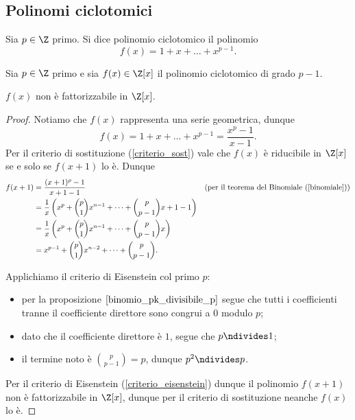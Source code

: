 \subsection{Polinomi ciclotomici}

\begin{definition}
    Sia $p \in \Z$ primo. Si dice polinomio ciclotomico il polinomio \[
        f(x) = 1 + x + \dots + x^{p-1}.    
    \]
\end{definition}

\begin{proposition}
    Sia $p \in \Z$ primo e sia $f(x) \in \Z[x]$ il polinomio ciclotomico di grado $p-1$. 

    $f(x)$ non è fattorizzabile in $\Z[x]$.
\end{proposition}
\begin{proof}
    Notiamo che $f(x)$ rappresenta una serie geometrica, dunque \[
        f(x) = 1 + x + \dots + x^{p-1} = \frac{x^p - 1}{x - 1}.    
    \] Per il criterio di sostituzione (\ref{criterio_sost}) vale che $f(x)$ è riducibile in $\Z[x]$ se e solo se $f(x+1)$ lo è. Dunque
    \begin{align*}
        f(x+1) &= \frac{(x+1)^p - 1}{x+1-1} &&\text{(per il teorema del Binomiale (\ref{binomiale}))}\\
        &= \frac1x \left( x^p + \binom{p}{1}x^{n-1} + \dots + \binom{p}{p-1}x + 1 - 1 \right)\\
        &= \frac1x \left( x^p + \binom{p}{1}x^{n-1} + \dots + \binom{p}{p-1}x \right)\\
        &= x^{p-1} + \binom{p}{1}x^{n-2} + \dots + \binom{p}{p-1}.
    \end{align*}

    Applichiamo il criterio di Eisenstein col primo $p$:
    \begin{itemize}
        \item per la proposizione $\ref{binomio_pk_divisibile_p}$ segue che tutti i coefficienti tranne il coefficiente direttore sono congrui a $0$ modulo $p$;
        \item dato che il coefficiente direttore è $1$, segue che $p \ndivides 1$;
        \item il termine noto è $\binom{p}{p-1} = p$, dunque $p^2 \ndivides p$.
    \end{itemize}
    Per il criterio di Eisenstein (\ref{criterio_eisenstein}) dunque il polinomio $f(x+1)$ non è fattorizzabile in $\Z[x]$, dunque per il criterio di sostituzione neanche $f(x)$ lo è. 
\end{proof}